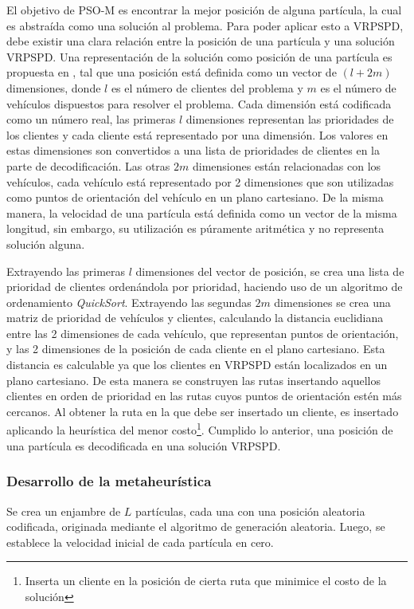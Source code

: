El objetivo de PSO-M es encontrar la mejor posición de alguna partícula, la cual es abstraída como una solución al problema. Para poder aplicar esto a VRPSPD, debe existir una clara relación entre la posición de una partícula y una solución VRPSPD. Una representación de la solución como posición de una partícula es propuesta en \cite{mpso}, tal que una posición está definida como un vector de $(l + 2m)$ dimensiones, donde $l$ es el número de clientes del problema y $m$ es el número de vehículos dispuestos para resolver el problema. Cada dimensión está codificada como un número real, las primeras $l$ dimensiones representan las prioridades de los clientes y cada cliente está representado por una dimensión. Los valores en estas dimensiones son convertidos a una lista de prioridades de clientes en la parte de decodificación. Las otras $2m$ dimensiones están relacionadas con los vehículos, cada vehículo está representado por 2 dimensiones que son utilizadas como puntos de orientación del vehículo en un plano cartesiano. De la misma manera, la velocidad de una partícula está definida como un vector de la misma longitud, sin embargo, su utilización es púramente aritmética y no representa solución alguna.

Extrayendo las primeras $l$ dimensiones del vector de posición, se crea una lista de prioridad de clientes or\-de\-nándo\-la por prioridad, haciendo uso de un algoritmo de ordenamiento \emph{QuickSort}. Extrayendo las segundas $2m$ dimensiones se crea una matriz de prioridad de vehículos y clientes, calculando la distancia euclidiana entre las 2 dimensiones de cada vehículo, que representan puntos de orientación, y las 2 dimensiones de la posición de cada cliente en el plano cartesiano. Esta distancia es calculable ya que los clientes en VRPSPD están localizados en un plano cartesiano. De esta manera se construyen las rutas insertando aquellos clientes en orden de prioridad en las rutas cuyos puntos de orientación estén más cercanos. Al obtener la ruta en la que debe ser insertado un cliente, es insertado aplicando la heurística del menor costo\footnote{Inserta un cliente en la posición de cierta ruta que minimice el costo de la solución}. Cumplido lo anterior, una posición de una partícula es decodificada en una solución VRPSPD.

\subsubsection*{Desarrollo de la metaheurística}

Se crea un enjambre de $L$ partículas, cada una con una posición aleatoria codificada, originada mediante el algoritmo de generación aleatoria. Luego, se establece la velocidad inicial de cada partícula en cero. 

